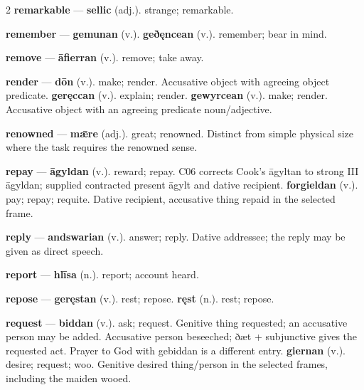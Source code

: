 \begin{multicols}{2}
\textbf{remarkable} — \textbf{sellic} (adj.). strange; remarkable.\par
\textbf{remember} — \textbf{gemunan} (v.).  \textbf{geðęncean} (v.). remember; bear in mind.\par
\textbf{remove} — \textbf{āfierran} (v.). remove; take away.\par
\textbf{render} — \textbf{dōn} (v.). make; render. Accusative object with agreeing object predicate. \textbf{geręccan} (v.). explain; render. \textbf{gewyrcean} (v.). make; render. Accusative object with an agreeing predicate noun/adjective.\par
\textbf{renowned} — \textbf{mǣre} (adj.). great; renowned. Distinct from simple physical size where the task requires the renowned sense.\par
\textbf{repay} — \textbf{āgyldan} (v.). reward; repay. C06 corrects Cook's āgyltan to strong III āgyldan; supplied contracted present āgylt and dative recipient. \textbf{forgieldan} (v.). pay; repay; requite. Dative recipient, accusative thing repaid in the selected frame.\par
\textbf{reply} — \textbf{andswarian} (v.). answer; reply. Dative addressee; the reply may be given as direct speech.\par
\textbf{report} — \textbf{hlīsa} (n.). report; account heard.\par
\textbf{repose} — \textbf{geręstan} (v.). rest; repose. \textbf{ręst} (n.). rest; repose.\par
\textbf{request} — \textbf{biddan} (v.). ask; request. Genitive thing requested; an accusative person may be added. Accusative person beseeched; ðæt + subjunctive gives the requested act. Prayer to God with gebiddan is a different entry. \textbf{giernan} (v.). desire; request; woo. Genitive desired thing/person in the selected frames, including the maiden wooed.\par

\end{multicols}
